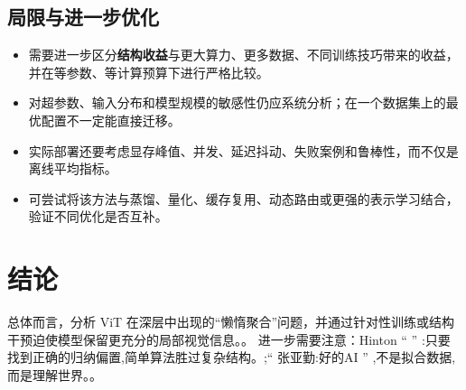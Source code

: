 \documentclass[UTF8,11pt,a4paper]{ctexart}
\newcommand{\term}[1]{\textbf{\textcolor{mainblue}{#1}}}
\begin{document}
\subsection{局限与进一步优化}
\begin{itemize}
\item 需要进一步区分\term{结构收益}与更大算力、更多数据、不同训练技巧带来的收益，并在等参数、等计算预算下进行严格比较。
\item 对超参数、输入分布和模型规模的敏感性仍应系统分析；在一个数据集上的最优配置不一定能直接迁移。
\item 实际部署还要考虑显存峰值、并发、延迟抖动、失败案例和鲁棒性，而不仅是离线平均指标。
\item 可尝试将该方法与蒸馏、量化、缓存复用、动态路由或更强的表示学习结合，验证不同优化是否互补。
\end{itemize}

\section{结论}
总体而言，分析 ViT 在深层中出现的“懒惰聚合”问题，并通过针对性训练或结构干预迫使模型保留更充分的局部视觉信息。。 进一步需要注意：Hinton “ ” :只要找到正确的归纳偏置,简单算法胜过复杂结构。;“ 张亚勤:好的AI ” ,不是拟合数据,而是理解世界。。
\end{document}
